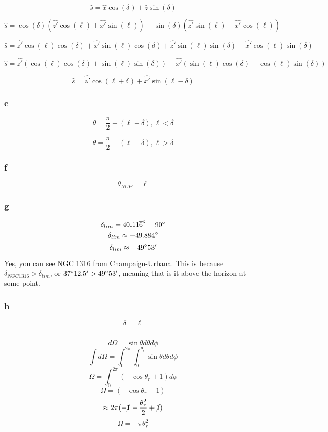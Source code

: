 \documentclass{article}
\begin{document}
\[\hat{s} = \hat{x}\cos(\delta) + \hat{z}\sin(\delta) \]


\[\hat{s} = \cos(\delta)(\hat{z'}\cos(\ell) + \hat{x'}\sin(\ell)) + \sin(\delta)(\hat{z'}\sin(\ell) - \hat{x'}\cos(\ell))\]

\[\hat{s} = \hat{z'}\cos(\ell)\cos(\delta) + \hat{x'}\sin(\ell)\cos(\delta) + \hat{z'}\sin(\ell)\sin(\delta) - \hat{x'}\cos(\ell)\sin(\delta)\]

\[\hat{s} = \hat{z'}(\cos(\ell)\cos(\delta) + \sin(\ell)\sin(\delta)) + \hat{x'}(\sin(\ell)\cos(\delta) - \cos(\ell)\sin(\delta))\]

\[\hat{s} = \hat{z'}\cos(\ell +\delta) + \hat{x'}\sin(\ell-\delta)\]

\subsubsection{e}

\[\theta = \frac{\pi}{2} - (\ell + \delta), \ell < \delta\]

\[\theta = \frac{\pi}{2} - (\ell - \delta), \ell > \delta\]

\subsubsection{f}

\[\theta_{NCP} = \ell\]
\subsubsection{g}

\[\delta_{lim} = 40.11\overline{6} \degree - 90\degree\]
\[\delta_{lim} \approx -49.884\degree \]
\[\delta_{lim} \approx -49\degree 53'\]

Yes, you can see  NGC 1316 from Champaign-Urbana. This is because $\delta_{NGC 1316} > \delta_{lim}$, or $37\degree12.5' > 49\degree 53'$, meaning that is it above the horizon at some point.

\subsubsection{h}
\[\delta = \ell\]

\subsection{}
\[d\Omega =\sin\theta d\theta d\phi\]
\[\int d\Omega = \int_{0}^{2\pi}\int_{0}^{\theta_{r}}\sin\theta d\theta d\phi\]
\[\Omega = \int_{0}^{2\pi}(-\cos\theta_{r} + 1) d\phi\]
\[\Omega = (-\cos\theta_{r} + 1)\]
\[\approx2\pi(-\cancel{1} -\frac{\theta_{r}^2}{2} +\cancel{1})\]
\[\Omega = -\pi\theta_{r}^2\]
\end{document}
